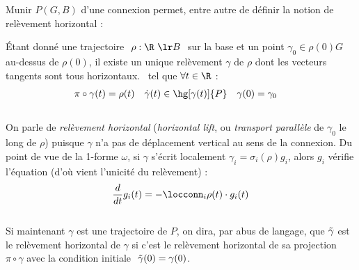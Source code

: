 Munir $P(G,B)$ d'une connexion permet, entre autre de définir la notion de relèvement horizontal :
\begin{definition}
Étant donné une trajectoire $\ \rho : \R\ \lr B\ $ sur la base et un point $\gamma_0\in \rho(0)G$ au-dessus de $\rho(0)$, il existe un unique relèvement $\gamma$ de $\rho$ dont les vecteurs tangents sont tous horizontaux. \ie~tel que $\forall t\in\R$ :
\begin{align} \label{eq:condi2hori_lift}
	\pi\circ\gamma(t) &= \rho(t)  &  \dot{\gamma}(t) &\in \hg[\gamma(t)]{P} &  \gamma(0) &= \gamma_0
\end{align}
\\
On parle de \emph{relèvement horizontal} (\emph{horizontal lift}, ou \emph{transport parallèle} de $\gamma_0$ le long de $\rho$) puisque $\gamma$ n'a pas de déplacement vertical au sens de la connexion. Du point de vue de la 1-forme $\omega$, si $\gamma$ s'écrit localement $\gamma_i = \sigma_i(\rho) g_i$, alors $g_i$ vérifie l'équation (d'où vient l'unicité du relèvement) :
\begin{equation} \label{eq:EDP2hori_lift}
	\frac{d}{dt}g_i(t)  = - \locconn_i\rho(t) \cdot g_i(t)
\end{equation}
\\
Si maintenant $\gamma$ est une trajectoire de $P$, on dira, par abus de langage, que $\Tilde{\gamma}$ est le relèvement horizontal de $\gamma$ si c'est le relèvement horizontal de sa projection $\pi\circ\gamma$ avec la condition initiale $\ \Tilde{\gamma}(0) = \gamma(0)$.
\end{definition}
\skipl


